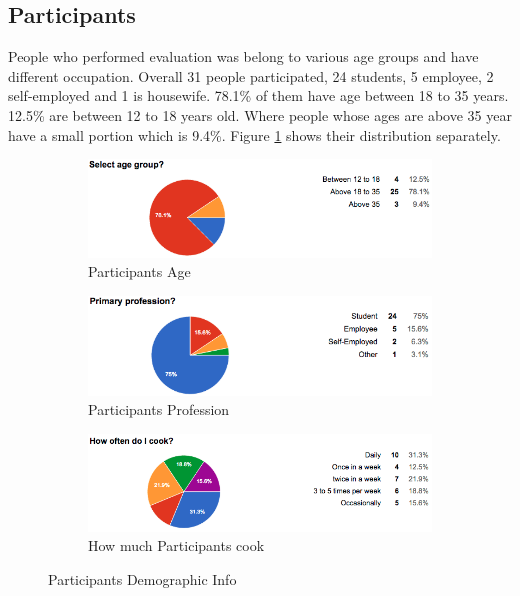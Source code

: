 \subsection {Participants}
People who performed evaluation was belong to various age groups and have different occupation. Overall 31 people participated, 24 students, 5 employee, 2 self-employed and 1 is housewife. 78.1\% of them have age between 18 to 35 years.  12.5\% are between 12 to 18 years old. Where people whose ages are above 35 year have a small portion which is 9.4\%. Figure \ref{fig:stat_demographic_info} shows their distribution separately. \newline
	  \begin{figure}[h]
	  	\centering
	  	\begin{subfigure}{.45\textwidth}
	  		\includegraphics[width=.9\linewidth]{figures/ch5_stat_age.png}
	  		\caption{Participants Age}
	  	\end{subfigure}
	  	\begin{subfigure}{.45\textwidth}
	  		\includegraphics[width=.9\linewidth]{figures/ch5_stat_profession.png}
	  		\caption{Participants Profession}
	  	\end{subfigure}
	  	\begin{subfigure}{.45\textwidth}
	  		\includegraphics[width=.9\linewidth]{figures/ch5_stat_cook.png}
	  		\caption{How much Participants cook}
	  	\end{subfigure}
	  	\caption{Participants Demographic Info}
	  	\label{fig:stat_demographic_info}
	  \end{figure}
	  

